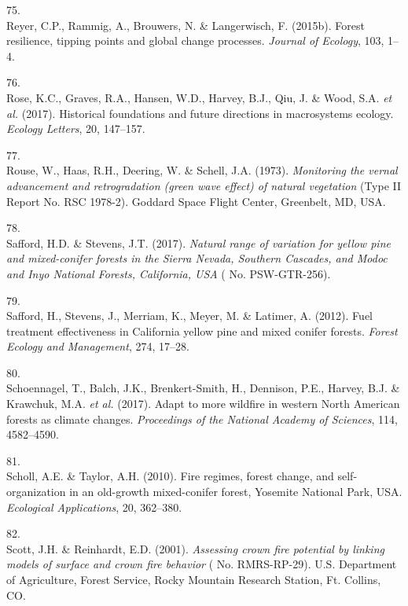 \documentclass[]{article}
\begin{document}
\leavevmode\hypertarget{ref-reyer2015}{}%
75.\\
Reyer, C.P., Rammig, A., Brouwers, N. \& Langerwisch, F. (2015b). Forest
resilience, tipping points and global change processes. \emph{Journal of
Ecology}, 103, 1--4.

\leavevmode\hypertarget{ref-rose2017}{}%
76.\\
Rose, K.C., Graves, R.A., Hansen, W.D., Harvey, B.J., Qiu, J. \& Wood,
S.A. \emph{et al.} (2017). Historical foundations and future directions
in macrosystems ecology. \emph{Ecology Letters}, 20, 147--157.

\leavevmode\hypertarget{ref-rouse1973}{}%
77.\\
Rouse, W., Haas, R.H., Deering, W. \& Schell, J.A. (1973).
\emph{Monitoring the vernal advancement and retrogradation (green wave
effect) of natural vegetation} (Type II Report No. RSC 1978-2). Goddard
Space Flight Center, Greenbelt, MD, USA.

\leavevmode\hypertarget{ref-safford2017}{}%
78.\\
Safford, H.D. \& Stevens, J.T. (2017). \emph{Natural range of variation
for yellow pine and mixed-conifer forests in the Sierra Nevada, Southern
Cascades, and Modoc and Inyo National Forests, California, USA} ( No.
PSW-GTR-256).

\leavevmode\hypertarget{ref-safford2012}{}%
79.\\
Safford, H., Stevens, J., Merriam, K., Meyer, M. \& Latimer, A. (2012).
Fuel treatment effectiveness in California yellow pine and mixed conifer
forests. \emph{Forest Ecology and Management}, 274, 17--28.

\leavevmode\hypertarget{ref-schoennagel2017}{}%
80.\\
Schoennagel, T., Balch, J.K., Brenkert-Smith, H., Dennison, P.E.,
Harvey, B.J. \& Krawchuk, M.A. \emph{et al.} (2017). Adapt to more
wildfire in western North American forests as climate changes.
\emph{Proceedings of the National Academy of Sciences}, 114, 4582--4590.

\leavevmode\hypertarget{ref-scholl2010}{}%
81.\\
Scholl, A.E. \& Taylor, A.H. (2010). Fire regimes, forest change, and
self-organization in an old-growth mixed-conifer forest, Yosemite
National Park, USA. \emph{Ecological Applications}, 20, 362--380.

\leavevmode\hypertarget{ref-scott2001}{}%
82.\\
Scott, J.H. \& Reinhardt, E.D. (2001). \emph{Assessing crown fire
potential by linking models of surface and crown fire behavior} ( No.
RMRS-RP-29). U.S. Department of Agriculture, Forest Service, Rocky
Mountain Research Station, Ft. Collins, CO.
\end{document}

